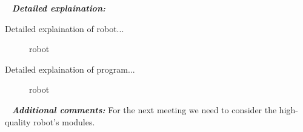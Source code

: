    \newline
  \textit{\textbf{Detailed explaination:}}
  \begin{enumerate*}
  	\item Detailed explaination of robot...
  	\begin{figure}[H]
  		\begin{minipage}[h]{1\linewidth}
  			\caption{robot}
  		\end{minipage}
  	\end{figure}
  	
  	\item Detailed explaination of program...
  	\begin{figure}[H]
  		\begin{minipage}[h]{1\linewidth}
  			\caption{robot}
  		\end{minipage}
  	\end{figure}
  	
  \end{enumerate*}
  
   \newline
  \textit{\textbf{Additional comments:}} For the next meeting we need to consider the high-quality robot's modules.

\fillpage
